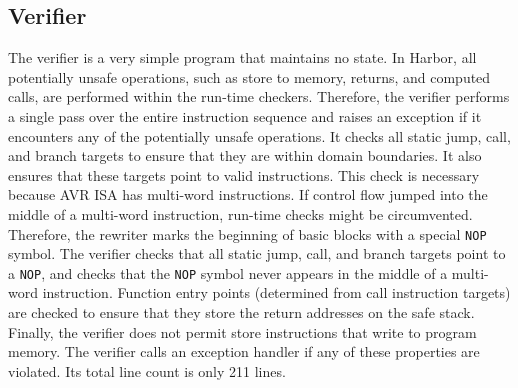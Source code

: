 \subsection{Verifier}
%
The verifier is a very simple program that maintains no state.
%
In Harbor, all potentially unsafe operations, such as store to
memory, returns, and computed calls, are performed within the
run-time checkers.
%
Therefore, the verifier performs a single pass over the entire
instruction sequence and raises an exception if it encounters
any of the potentially unsafe operations. 
%
It checks all static jump, call, and branch targets to ensure that
they are within domain boundaries.
%
It also ensures that these targets point to valid instructions.
%
This check is necessary because AVR ISA has multi-word instructions.
%
If control flow jumped into the middle of a multi-word instruction,
run-time checks might be circumvented.
%
Therefore, the rewriter marks the beginning of basic blocks with a special
\texttt{NOP} symbol.
%
The verifier checks that all static jump, call, and branch targets
point to a \texttt{NOP}, and checks that the \texttt{NOP} symbol never
appears in the middle of a multi-word instruction.
%
% 
%
Function entry points (determined from call instruction targets) are
checked to ensure that they store the return addresses on the safe stack.
%
Finally, the verifier does not permit store instructions that write to
program memory.
%
The verifier calls an exception handler if any of these properties are violated.
%
Its total line count is only 211 lines.
%
